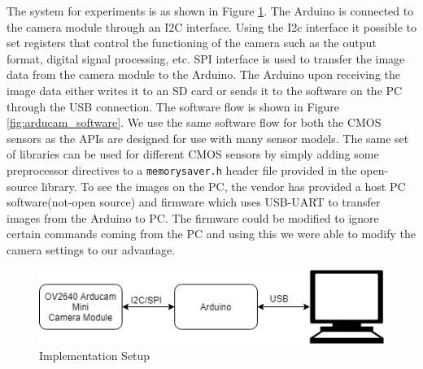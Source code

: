 The system for experiments is as shown in Figure \ref{fig:imp_setup}. The Arduino is connected to the camera module through an I2C interface. Using the I2c interface it possible to set registers that control the functioning of the camera such as the output format, digital signal processing, etc. SPI interface is used to transfer the image data from the camera module to the Arduino. The Arduino upon receiving the image data either writes it to an  SD card or sends it to the software on the PC through the USB connection. The software flow is shown in Figure \ref{fig:arducam_software}. We use the same software flow for both the CMOS sensors as the APIs are designed for use with many sensor models. The same set of libraries can be used for different CMOS sensors by simply adding some preprocessor directives to a \texttt{memorysaver.h} header file provided in the open-source library. To see the images on the PC, the vendor has provided a host PC software(not-open source) and firmware which uses USB-UART to transfer images from the Arduino to PC. The firmware could be modified to ignore certain commands coming from the PC and using this we were able to modify the camera settings to our advantage. 
\begin{figure}[!htbp]
\centering
\includegraphics[scale=0.75]{pics/implementation_setup}
\caption{Implementation Setup}
\label{fig:imp_setup}
\end{figure}

